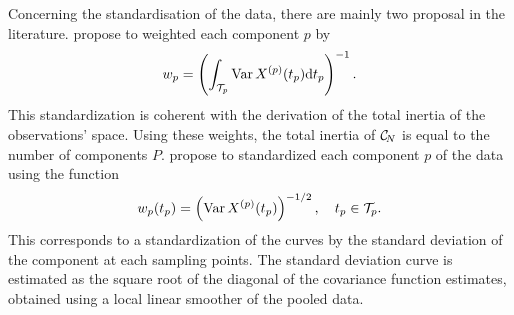 Concerning the standardisation of the data, there are mainly two proposal in the literature. \cite{happMultivariateFunctionalPrincipal2018a} propose to weighted each component $p$ by
\begin{equation}
w_p = \left(\int_{\mathcal{T}_{p}} \operatorname{Var} X^{(p)}(t_p) {\rm d} t_p\right)^{-1}.
\end{equation}
This standardization is coherent with the derivation of the total inertia of the observations' space. Using these weights, the total inertia of $\mathcal{C}_{\!N}$ is equal to the number of components $P$. \cite{chiouMultivariateFunctionalPrincipal2014} propose to standardized each component $p$ of the data using the function
\begin{equation}
w_p(t_p) = \left(\operatorname{Var} X^{(p)}(t_p)\right)^{-1/2}, \quad t_p \in \mathcal{T}_{p}.
\end{equation}
This corresponds to a standardization of the curves by the standard deviation of the component at each sampling points. The standard deviation curve is estimated as the square root of the diagonal of the covariance function estimates, obtained using a local linear smoother of the pooled data. 


